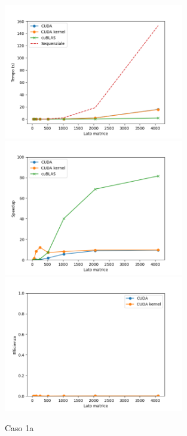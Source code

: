 \begin{figure}[ht]
    \centering
    \includegraphics[width=0.7\textwidth]{./imgs/graphs/caso_0.png}
    \includegraphics[width=0.7\textwidth]{./imgs/graphs/caso_0_speedup.png}
    \includegraphics[width=0.7\textwidth]{./imgs/graphs/caso_0_efficiency.png}
    \caption{Caso 1a}
\end{figure}

